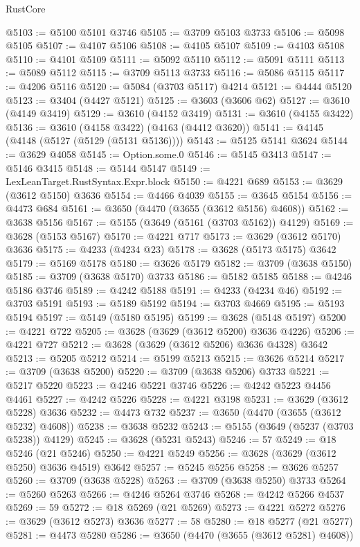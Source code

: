 \begin{lexlean}{RustCore}
\begin{coremodule}
@5103 := @5100 @5101 @3746
@5105 := @3709 @5103 @3733
@5106 := @5098 @5105
@5107 := @4107 @5106
@5108 := @4105 @5107
@5109 := @4103 @5108
@5110 := @4101 @5109
@5111 := @5092 @5110
@5112 := @5091 @5111
@5113 := @5089 @5112
@5115 := @3709 @5113 @3733
@5116 := @5086 @5115
@5117 := @4206 @5116
@5120 := @5084 (@3703 @5117) @4214
@5121 := @4444 @5120
@5123 := @3404 (@4427 @5121)
@5125 := @3603 (@3606 @62)
@5127 := @3610 (@4149 @3419)
@5129 := @3610 (@4152 @3419)
@5131 := @3610 (@4155 @3422)
@5136 := @3610 (@4158 @3422) (@4163 (@4412 @3620))
@5141 := @4145 (@4148 (@5127 (@5129 (@5131 @5136))))
@5143 := @5125 @5141 @3624
@5144 := @3629 @4058
@5145 := Option.some.{0}
@5146 := @5145 @3413
@5147 := @5146 @3415
@5148 := @5144 @5147
@5149 := LexLeanTarget.RustSyntax.Expr.block
@5150 := @4221 @689
@5153 := @3629 (@3612 @5150) @3636
@5154 := @4466 @4039
@5155 := @3645 @5154
@5156 := @4473 @684
@5161 := @3650 (@4470 (@3655 (@3612 @5156) @4608))
@5162 := @3638 @5156
@5167 := @5155 (@3649 (@5161 (@3703 @5162)) @4129)
@5169 := @3628 (@5153 @5167)
@5170 := @4221 @717
@5173 := @3629 (@3612 @5170) @3636
@5175 := @4233 (@4234 @23)
@5178 := @3628 (@5173 @5175) @3642
@5179 := @5169 @5178
@5180 := @3626 @5179
@5182 := @3709 (@3638 @5150)
@5185 := @3709 (@3638 @5170) @3733
@5186 := @5182 @5185
@5188 := @4246 @5186 @3746
@5189 := @4242 @5188
@5191 := @4233 (@4234 @46)
@5192 := @3703 @5191
@5193 := @5189 @5192
@5194 := @3703 @4669
@5195 := @5193 @5194
@5197 := @5149 (@5180 @5195)
@5199 := @3628 (@5148 @5197)
@5200 := @4221 @722
@5205 := @3628 (@3629 (@3612 @5200) @3636 @4226)
@5206 := @4221 @727
@5212 := @3628 (@3629 (@3612 @5206) @3636 @4328) @3642
@5213 := @5205 @5212
@5214 := @5199 @5213
@5215 := @3626 @5214
@5217 := @3709 (@3638 @5200)
@5220 := @3709 (@3638 @5206) @3733
@5221 := @5217 @5220
@5223 := @4246 @5221 @3746
@5226 := @4242 @5223 @4456 @4461
@5227 := @4242 @5226
@5228 := @4221 @3198
@5231 := @3629 (@3612 @5228) @3636
@5232 := @4473 @732
@5237 := @3650 (@4470 (@3655 (@3612 @5232) @4608))
@5238 := @3638 @5232
@5243 := @5155 (@3649 (@5237 (@3703 @5238)) @4129)
@5245 := @3628 (@5231 @5243)
@5246 := 57
@5249 := @18 @5246 (@21 @5246)
@5250 := @4221 @5249
@5256 := @3628 (@3629 (@3612 @5250) @3636 @4519) @3642
@5257 := @5245 @5256
@5258 := @3626 @5257
@5260 := @3709 (@3638 @5228)
@5263 := @3709 (@3638 @5250) @3733
@5264 := @5260 @5263
@5266 := @4246 @5264 @3746
@5268 := @4242 @5266 @4537
@5269 := 59
@5272 := @18 @5269 (@21 @5269)
@5273 := @4221 @5272
@5276 := @3629 (@3612 @5273) @3636
@5277 := 58
@5280 := @18 @5277 (@21 @5277)
@5281 := @4473 @5280
@5286 := @3650 (@4470 (@3655 (@3612 @5281) @4608))

\end{coremodule}
\end{lexlean}
